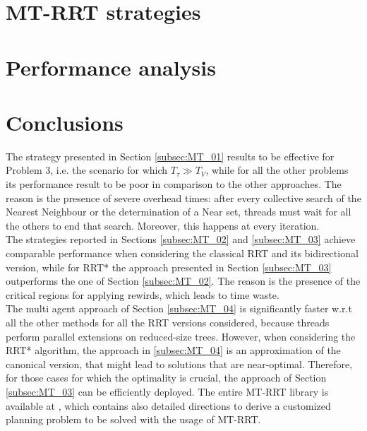 \documentclass[letterpaper, 10 pt, conference]{ieeeconf}  %
\begin{document}
\section{MT-RRT strategies}
\label{sec:cap_03}


%


\section{Performance analysis}
\label{sec:cap_04}



\section{Conclusions}
\label{sec:conclusion}

The strategy presented in Section \ref{subsec:MT_01} results to be effective for Problem 3, i.e. the scenario for which $T_{\tau}  \gg T_V$, while for all the other problems its performance result to be poor in comparison to the other approaches. The reason is the presence of severe overhead times: after every collective search of the Nearest Neighbour or the determination of a Near set, threads must wait for all the others to end that search. Moreover, this happens at every iteration.
\\
The strategies reported in Sections \ref{subsec:MT_02} and \ref{subsec:MT_03} achieve comparable performance when considering the classical RRT and its bidirectional version, while for RRT* the approach presented in Section \ref{subsec:MT_03} outperforms the one of Section \ref{subsec:MT_02}. The reason is the presence of the critical regions for applying rewirds, which leads to time waste. 
\\
The multi agent approach of Section \ref{subsec:MT_04} is significantly faster w.r.t all the other methods for all the RRT versions considered, because threads perform parallel extensions on reduced-size trees. 
However, when considering the RRT* algorithm, the approach in \ref{subsec:MT_04} is an approximation of the canonical version, that might lead to solutions that are near-optimal. Therefore, for those cases for which the optimality is crucial, the approach of Section \ref{subsec:MT_03} can be efficiently deployed.
The entire MT-RRT library is available at \cite{github_link}, which contains also detailed directions to derive a customized planning problem to be solved with the usage of MT-RRT.





\end{document}
